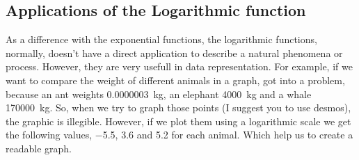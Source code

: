 \documentclass[../main.tex]{subfiles}
\begin{document}
\subsection{Applications of the Logarithmic function}

As a difference with the exponential functions, the logarithmic functions, normally, doesn't have a direct application to describe a natural phenomena or process.
However, they are very usefull in data representation.
For example, if we want to compare the weight of different animals in a graph, got into a problem, because an ant weights \SI{0.0000003}{\kilo\gram}, an elephant \SI{4000}{\kilo\gram} and a whale \SI{170000}{\kilo\gram}.
So, when we try to graph those points (I suggest you to use desmos), the graphic is illegible.
However, if we plot them using a logarithmic scale we get the following values, \num{-5.5}, \num{3.6} and \num{5.2} for each animal.
Which help us to create a readable graph.
\end{document}
